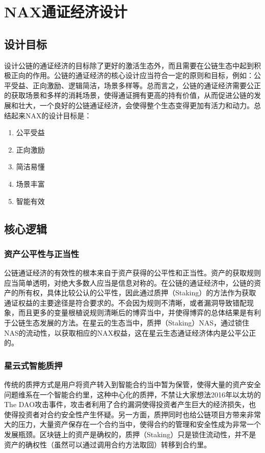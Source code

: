 \section{NAX通证经济设计}
\subsection{设计目标}
设计公链的通证经济的目标除了更好的激活生态外，而且需要在公链生态中起到积极正向的作用。公链的通证经济的核心设计应当符合一定的原则和目标，例如：公平受益、正向激励、逻辑简洁，场景多样等。总而言之，公链的通证经济需要公正的获取场景和多样的消耗场景，使得通证拥有更高的持有价值，从而促进公链的发展和壮大，一个良好的公链通证经济，会使得整个生态变得更加有活力和动力。总结起来NAX的设计目标是：

\begin{enumerate}[\hspace{2cm}(a)]
    \item 公平受益
    \item 正向激励
    \item 简洁易懂
    \item 场景丰富
    \item 智能有效
\end{enumerate}

\subsection{核心逻辑}

\subsubsection{资产公平性与正当性}
公链通证经济的有效性的根本来自于资产获得的公平性和正当性。资产的获取规则应当简单透明，对绝大多数人应当是信息对称的。在公链的通证经济中，公链的资产的所有权，具体比较公认的公平性，因此通过质押（Staking）的方法作为获取通证权益的主要途径是符合要求的。不会因为规则不清晰，或者漏洞导致错配现象，而且更多的变量根植说规则清晰后的博弈当中，并使得博弈的总体结果是有利于公链生态发展的方法。在星云的生态当中，质押（Staking）NAS，通过锁住NAS的流动性，以获取相应的NAX权益，这在星云生态通证经济体内是公平公正的。

\subsubsection{星云式智能质押}
传统的质押方式是用户将资产转入到智能合约当中暂为保管，使得大量的资产安全问题维系在一个智能合约里，这种中心化的质押，不禁让大家想法2016年以太坊的The DAO攻击事件，攻击者利用了合约漏洞使得投资者产生巨大的经济损失，也使得投资者对合约安全性产生怀疑。另一方面，质押同时也给公链项目方带来非常大的压力，大量资产保存在一个合约当中，使得合约的管理和安全性成为非常一个发展瓶颈。区块链上的资产是确权的，质押（Staking）只是锁住流动性，并不是资产的确权性（虽然可以通过调用合约方法取回）转移到合约里。

